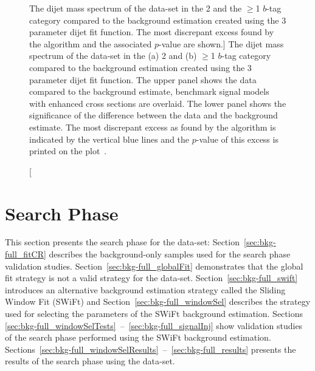 \begin{figure}[!htb]
\begin{center}
  \end{center}
  \caption
      [The dijet mass spectrum of the \summer{} data-set in the 2 and the $\geq$1 $b$-tag category
        compared to the background estimation created using the 3 parameter dijet fit function.
        The most discrepant excess found by the \bh{} algorithm and the associated \mbox{$p$-value} are shown.]        
      {The dijet mass spectrum of the  \summer{} data-set in the (a) 2 and (b) $\geq$1 $b$-tag category
        compared to the background estimation created using the 3 parameter dijet fit function.
        The upper panel shows the data compared to the background estimate,
        benchmark signal models with enhanced cross sections are overlaid.
        The lower panel shows the significance of the difference between the data and the background estimate.
        The most discrepant excess as found by the \bh{} algorithm is indicated by the vertical blue lines and the \mbox{$p$-value} of this excess is printed on the plot~\cite{dibjet-ichep_conf}.
          }
  \label{fig:bkg-summer_searchPhase}
\end{figure}

\clearpage
\section{\lm{} Search Phase}
\label{sec:bkg-full}

This section presents the search phase for the \lm{} data-set:
Section~\ref{sec:bkg-full_fitCR} describes the background-only samples used for the search phase validation studies.
Section~\ref{sec:bkg-full_globalFit} demonstrates that the global fit strategy is not a valid strategy for the \lm{} data-set.
Section~\ref{sec:bkg-full_swift} introduces an alternative background estimation strategy called the Sliding Window Fit (SWiFt)
and Section~\ref{sec:bkg-full_windowSel} describes the strategy used for selecting the parameters of the SWiFt background estimation.
Sections \ref{sec:bkg-full_windowSelTests}~--~\ref{sec:bkg-full_signalInj} show validation studies
of the search phase performed using the SWiFt background estimation.
Sections~\ref{sec:bkg-full_windowSelResults}~--~\ref{sec:bkg-full_results} presents the results of the search phase using the \lm{} data-set.

